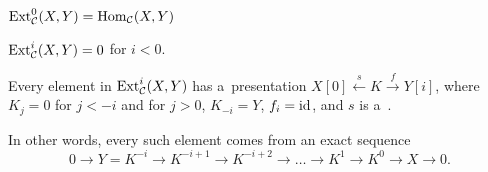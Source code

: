 	\begin{theorem}
		$\mathrm{Ext}_{\mathcal{C}}^0(X,Y) = \mathrm{Hom}_{\mathcal{C}}(X,Y)$
	\end{theorem}
	
	\begin{theorem}
		$\mathrm{Ext}_{\mathcal{C}}^i(X,Y) = 0$ for $i<0$.
	\end{theorem}
	
	\begin{theorem}
		Every element in $\mathrm{Ext}_{\mathcal{C}}^i(X,Y)$ has a~presentation 
		$X[0] \xleftarrow{s} K \xrightarrow{f} Y[i]$,
		where $K_j = 0$ for $j < -i$ and for $j > 0$,
		$K_{-i} = Y$, $f_i = {\mathrm{id}}$, and $s$ is a~\qi.
		
		In other words, every such element comes from
		an exact sequence
		$$0 \to Y= K^{-i} \to K^{-i+1} \to K^{-i+2} \to \ldots
		\to K^1 \to K^0 \to X \to 0.$$
	\end{theorem}













 
 
